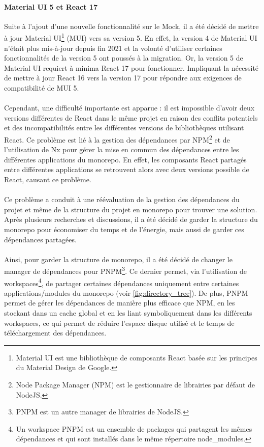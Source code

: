 \documentclass[12pt, a4paper]{report}
\begin{document}
	\newpage
	\paragraph{Material UI 5 et React 17}

	Suite à l'ajout d'une nouvelle fonctionnalité sur le Mock, il a été décidé de mettre à jour Material UI\footnote{Material UI est une bibliothèque de composants React basée sur les principes du Material Design de Google.} (MUI) vers sa version 5. En effet, la version 4 de Material UI n'était plus mis-à-jour depuis fin 2021 et la volonté d'utiliser certaines fonctionnalités de la version 5 ont poussés à la migration. Or, la version 5 de Material UI requiert à minima React 17 pour fonctionner. Impliquant la nécessité de mettre à jour React 16 vers la version 17 pour répondre aux exigences de compatibilité de MUI 5.
	\\\\
	Cependant, une difficulté importante est apparue : il est impossible d'avoir deux versions différentes de React dans le même projet en raison des conflits potentiels et des incompatibilités entre les différentes versions de bibliothèques utilisant React. Ce problème est lié à la gestion des dépendances par NPM\footnote{Node Package Manager (NPM) est le gestionnaire de librairies par défaut de NodeJS.} et de l'utilisation de Nx pour gérer la mise en commun des dépendances entre les différentes applications du monorepo. En effet, les composants React partagés entre différentes applications se retrouvent alors avec deux versions possible de React, causant ce problème.
	\\\\
	Ce problème a conduit à une réévaluation de la gestion des dépendances du projet et même de la structure du projet en monorepo pour trouver une solution. Après plusieurs recherches et discussions, il a été décidé de garder la structure du monorepo pour économiser du temps et de l'énergie, mais aussi de garder ces dépendances partagées. 
	\\\\
	Ainsi, pour garder la structure de monorepo, il a été décidé de changer le manager de dépendances pour PNPM\footnote{PNPM est un autre manager de librairies de NodeJS.}. Ce dernier permet, via l'utilisation de workspaces\footnote{Un workspace PNPM est un ensemble de packages qui partagent les mêmes dépendances et qui sont installés dans le même répertoire node\_modules.}, de partager certaines dépendances uniquement entre certaines applications/modules du monorepo (voir \ref{fig:directory_tree}). De plus, PNPM permet de gérer les dépendances de manière plus efficace que NPM, en les stockant dans un cache global et en les liant symboliquement dans les différents workspaces, ce qui permet de réduire l'espace disque utilisé et le temps de téléchargement des dépendances.
\end{document}
